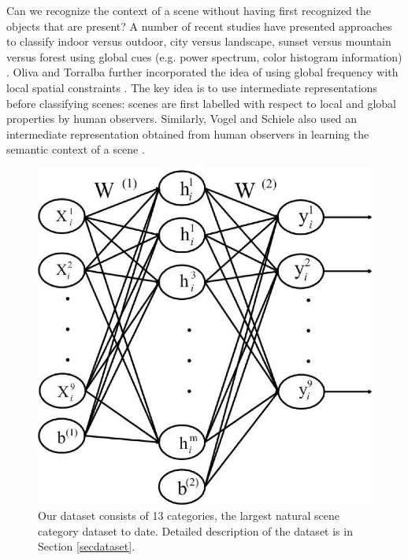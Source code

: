 \documentclass[10pt,a4paper,twocolumn]{article}
\begin{document}
\hspace{.5cm}Can we recognize the context of a scene without having first recognized the objects that are present? A number of recent studies have presented approaches to classify indoor versus outdoor, city versus landscape, sunset versus mountain versus forest using global cues (e.g. power spectrum, color histogram information) \cite{picard, szummer, jain}. Oliva and Torralba further incorporated the idea of using global frequency with local spatial constraints \cite{oliva}. The key idea is to use intermediate representations before classifying scenes: scenes are first labelled with respect to local and global properties by human observers. Similarly, Vogel and Schiele also used an intermediate representation obtained from human observers in learning the semantic context of a scene \cite{vogel}.

\begin{figure}
\includegraphics[scale=.3]{figure_1.jpg}
\caption{Our dataset consists of 13 categories, the largest natural scene category dataset to date. Detailed description of the dataset is in Section \ref{secdataset}.}
\label{fig:dataset}
\end{figure}
\end{document}
